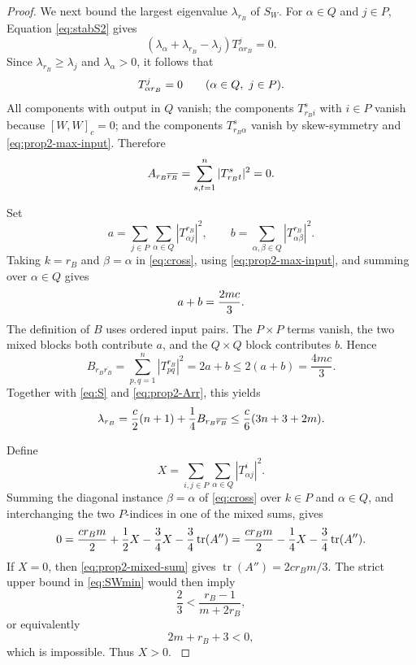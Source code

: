 \documentclass{amsart}
\begin{document}
\begin{proof}
{We next bound } the largest eigenvalue $\lambda_{r_B}$   {of } $S_W$.   {For
$\alpha\in Q$ } and  $j\in P$,   {Equation \eqref{eq:stabS2} gives
}\[
 {(\lambda_\alpha+\lambda_{r_B}-\lambda_j)T^j_{\alpha r_B}=0.
}\]
  {Since $\lambda_{r_B}\geq\lambda_j$ and $\lambda_\alpha>0$, it follows that
}\begin{equation}{\label{eq:prop2-max-input}
 T^j_{\alpha r_B}=0
 \qquad (\alpha\in Q,\ j\in P).
}\end{equation}
  {All components with output in $Q$ vanish; the components
$T^s_{r_Bi}$ with $i\in P$ vanish because $[W,W]_c=0$; and the components
$T^s_{r_B\alpha}$ vanish by skew-symmetry and
\eqref{eq:prop2-max-input}. Therefore
}\begin{equation}{\label{eq:prop2-Arr}
 A_{r_B\overline{r_B}}=\sum_{s,t=1}^n|T^s_{r_Bt}|^2=0.
}\end{equation}

{Set
}\[
 {a=\sum_{j\in P}\sum_{\alpha\in Q}|T^{r_B}_{\alpha j}|^2,
 \qquad
 b=\sum_{\alpha,\beta\in Q}|T^{r_B}_{\alpha\beta}|^2.
}\]
{Taking $k=r_B$ and $\beta=\alpha$ in \eqref{eq:cross}, using
\eqref{eq:prop2-max-input}, and summing over $\alpha\in Q$ gives
}\begin{equation}{\label{eq:prop2-ab}
 a+b=\frac{2mc}{3}.
}\end{equation}
{The definition of $B$ uses ordered input pairs. The $P\times P$
terms vanish, the two mixed blocks both contribute $a$, and the
$Q\times Q$ block contributes $b$. Hence
}\[
 {B_{r_B\overline{r_B}}
 =\sum_{p,q=1}^n|T^{r_B}_{pq}|^2
 =2a+b
 \leq2(a+b)=\frac{4mc}{3}.
}\]
{Together with \eqref{eq:S} and \eqref{eq:prop2-Arr}, this yields
}\begin{equation}{\label{eq:max1}
 \lambda_{r_B}
 =\frac{c}{2}(n+1)+\frac{1}{4}B_{r_B\overline{r_B}}
 \leq\frac{c}{6}(3n+3+2m).
}\end{equation}

{Define
}\[
{X=\sum_{i,j\in P}\sum_{\alpha\in Q}|T^i_{\alpha j}|^2.
}\]
{Summing the diagonal instance $\beta=\alpha$ of \eqref{eq:cross}
over } $k\in P$   {and $\alpha\in Q$, and interchanging the two $P$-indices
in one of the mixed sums, gives
}\begin{equation}{\label{eq:prop2-mixed-sum}
 0=\frac{cr_Bm}{2}+\frac{1}{2}X-\frac{3}{4}X-\frac{3}{4}\operatorname{tr}(A'')
  =\frac{cr_Bm}{2}-\frac{1}{4}X-\frac{3}{4}\operatorname{tr}(A'').
}\end{equation}
If   {$X=0$, then \eqref{eq:prop2-mixed-sum} gives
$\operatorname{tr}(A'')=2cr_Bm/3$. The strict upper bound in \eqref{eq:SWmin} would then
imply
}\[
{\frac{2}{3}<
 \frac{r_B-1}{m+2r_B},
}\]
{or equivalently
}\[
{2m+r_B+3<0,
}\]
which is   {impossible. Thus $X>0$.
}


\end{proof}
\end{document}
